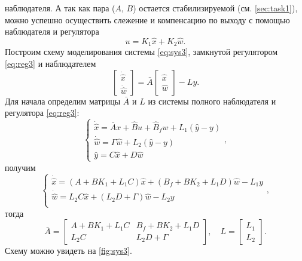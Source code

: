 наблюдателя. А так как пара ($A$, $B$) остается стабилизируемой (см. \autoref{sec:task1}),
можно успешно осуществить слежение и компенсацию по выходу с помощью наблюдателя и регулятора
\begin{equation}
    u=K_1\hat x+K_2\hat w.
    \label{eq:reg3}
\end{equation}
Построим схему моделирования системы \eqref{eq:sys3},
замкнутой регулятором \eqref{eq:reg3} и наблюдателем
\begin{equation}
    \label{eq:obs3}
    \begin{bmatrix}
        \dot{\hat x}\\
        \dot{\hat w}
    \end{bmatrix}=
    \bar A\begin{bmatrix}
        \hat x\\
        \hat w
    \end{bmatrix}
    -Ly.
\end{equation}
Для начала определим матрицы $\bar A$ и $L$ из системы полного 
наблюдателя и регулятора \eqref{eq:reg3}:
\begin{equation*}
    \begin{cases}
        \dot{\hat x}=\bar Ax+\hat Bu+\hat B_fw+L_1(\hat y-y)\\
        \dot{\hat w}=\Gamma\hat w+L_2(\hat y-y)\\
        \hat y=C\hat x+D\hat w
    \end{cases},
\end{equation*}
получим
\begin{equation*}
    \begin{cases}
        \dot{\hat x}=(A+BK_1+L_1C)\hat x+(B_f+BK_2+L_1D)\hat w-L_1y\\
        \dot{\hat w}=L_2C\hat x+(L_2D+\Gamma)\hat w-L_2y\\
    \end{cases},
\end{equation*}
тогда
\begin{equation}
    \label{eq:al}
    \bar A=\begin{bmatrix}
        A+BK_1+L_1C & B_f+BK_2+L_1D\\
        L_2C & L_2D+\Gamma
    \end{bmatrix},\quad
    L=\begin{bmatrix}
        L_1\\L_2
    \end{bmatrix}.
\end{equation}
Схему можно увидеть на \autoref{fig:sys3}.
